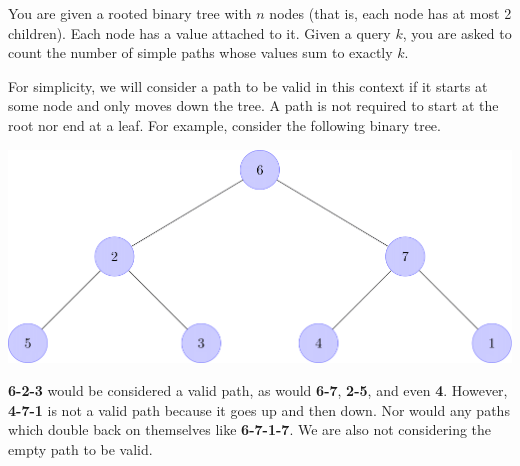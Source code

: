 You are given a rooted binary tree with $n$ nodes (that is, each node has at most 2 children). Each node has a value attached to it. Given a query $k$, you are asked to count the number of simple paths whose values sum to exactly $k$.

For simplicity, we will consider a path to be valid in this context if it starts at some node and only moves down the tree. A path is not required to start at the root nor end at a leaf. For example, consider the following binary tree.

\begin{center}
\includegraphics{example_binary_tree.png}
\end{center}

\textbf{6-2-3} would be considered a valid path, as would \textbf{6-7}, \textbf{2-5}, and even \textbf{4}. However, \textbf{4-7-1} is not a valid path because it goes up and then down. Nor would any paths which double back on themselves like \textbf{6-7-1-7}. We are also not considering the empty path to be valid.